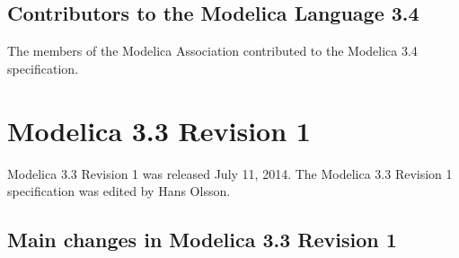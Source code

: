 \subsection{Contributors to the Modelica Language 3.4}\label{contributors-to-the-modelica-language-3-4}

The members of the Modelica Association contributed to the Modelica 3.4
specification.

\section{Modelica 3.3 Revision 1}\label{modelica-3-3-revision-1}

Modelica 3.3 Revision 1 was released July 11, 2014. The Modelica 3.3
Revision 1 specification was edited by Hans Olsson.

\subsection{Main changes in Modelica 3.3 Revision 1}\label{main-changes-in-modelica-3-3-revision-1}

